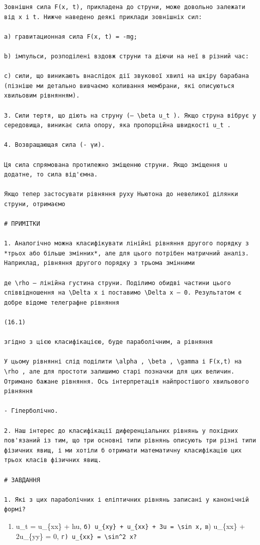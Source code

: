 \documentclass[
  ukrainian,
]{article}
\providecommand{\tightlist}{%
  \setlength{\itemsep}{0pt}\setlength{\parskip}{0pt}}
\begin{document}
\begin{verbatim}
Зовнішня сила F(x, t), прикладена до струни, може довольно залежати від x і t. Нижче наведено деякі приклади зовнішніх сил:

а) гравитационная сила F(x, t) = -mg;

b) імпульси, розподілені вздовж струни та діючи на неї в різний час:

c) сили, що виникають внаслідок дії звукової хвилі на шкіру барабана (пізніше ми детально вивчаємо коливання мембрани, які описуються хвильовим рівнянням).

3. Сили тертя, що діють на струну (— \beta u_t ). Якщо струна вібрує у середовища, виникає сила опору, яка пропорційна швидкості u_t .

4. Возвращающая сила (- үи).

Ця сила спрямована протилежно зміщенню струни. Якщо зміщення u додатне, то сила від'ємна.

Якщо тепер застосувати рівняння руху Ньютона до невеликої ділянки струни, отримаємо

# ПРИМІТКИ

1. Аналогічно можна класифікувати лінійні рівняння другого порядку з *трьох або більше змінних*, але для цього потрібен матричний аналіз. Наприклад, рівняння другого порядку з трьома змінними

де \rho — лінійна густина струни. Поділимо обидві частини цього співвідношення на \Delta x і поставимо \Delta x — 0. Результатом є добре відоме телеграфне рівняння

(16.1)

згідно з цією класифікацією, буде параболічним, а рівняння

У цьому рівнянні слід поділити \alpha , \beta , \gamma і F(x,t) на \rho , але для простоти залишимо старі позначки для цих величин. Отримано бажане рівняння. Ось інтерпретація найпростішого хвильового рівняння

- Гіперболічно.

2. Наш інтерес до класифікації диференціальних рівнянь у похідних пов'язаний із тим, що три основні типи рівнянь описують три різні типи фізичних явищ, і ми хотіли б отримати математичну класифікацію цих трьох класів фізичних явищ.

# ЗАВДАННЯ

1. Які з цих параболічних і еліптичних рівнянь записані у канонічній формі?
\end{verbatim}

\begin{enumerate}
\def\labelenumi{\alph{enumi})}
\tightlist
\item
  u\_t = u\_\{xx\} + hu,
  \texttt{б)\ u\_\{xy\}\ +\ u\_\{xx\}\ +\ 3u\ =\ \textbackslash{}sin\ x,}
  в) u\_\{xx\} + 2u\_\{yy\} = 0,
  \texttt{г)\ u\_\{xx\}\ =\ \textbackslash{}sin\^{}2\ x?}
\end{enumerate}
\end{document}

